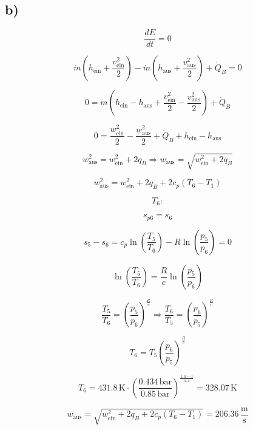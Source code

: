 

\subsection*{b)}

\[
\frac{dE}{dt} = 0
\]

\[
\dot{m} (h_{\text{ein}} + \frac{v_{\text{ein}}^2}{2}) - \dot{m} (h_{\text{aus}} + \frac{v_{\text{aus}}^2}{2}) + \dot{Q}_B = 0
\]

\[
0 = \dot{m} (h_{\text{ein}} - h_{\text{aus}} + \frac{v_{\text{ein}}^2}{2} - \frac{v_{\text{aus}}^2}{2}) + \dot{Q}_B
\]

\[
0 = \frac{w_{\text{ein}}^2}{2} - \frac{w_{\text{aus}}^2}{2} + \dot{Q}_B + h_{\text{ein}} - h_{\text{aus}}
\]

\[
w_{\text{aus}}^2 = w_{\text{ein}}^2 + 2q_B \Rightarrow w_{\text{aus}} = \sqrt{w_{\text{ein}}^2 + 2q_B}
\]

\[
w_{\text{aus}}^2 = w_{\text{ein}}^2 + 2q_B + 2c_p (T_6 - T_1)
\]

\[
T_6:
\]

\[
s_{p6} = s_6
\]

\[
s_5 - s_6 = c_p \ln \left( \frac{T_5}{T_6} \right) - R \ln \left( \frac{p_5}{p_6} \right) = 0
\]

\[
\ln \left( \frac{T_5}{T_6} \right) = \frac{R}{c} \ln \left( \frac{p_5}{p_6} \right)
\]

\[
\frac{T_5}{T_6} = \left( \frac{p_5}{p_6} \right)^{\frac{R}{c}} \Rightarrow \frac{T_6}{T_5} = \left( \frac{p_6}{p_5} \right)^{\frac{R}{c}}
\]

\[
T_6 = T_5 \left( \frac{p_6}{p_5} \right)^{\frac{R}{c}}
\]

\[
T_6 = 431.8 \, \text{K} \cdot \left( \frac{0.434 \, \text{bar}}{0.85 \, \text{bar}} \right)^{\frac{1.4 - 1}{1.4}} = 328.07 \, \text{K}
\]

\[
w_{\text{aus}} = \sqrt{w_{\text{ein}}^2 + 2q_B + 2c_p (T_6 - T_1)} = 206.36 \, \frac{\text{m}}{\text{s}}
\]